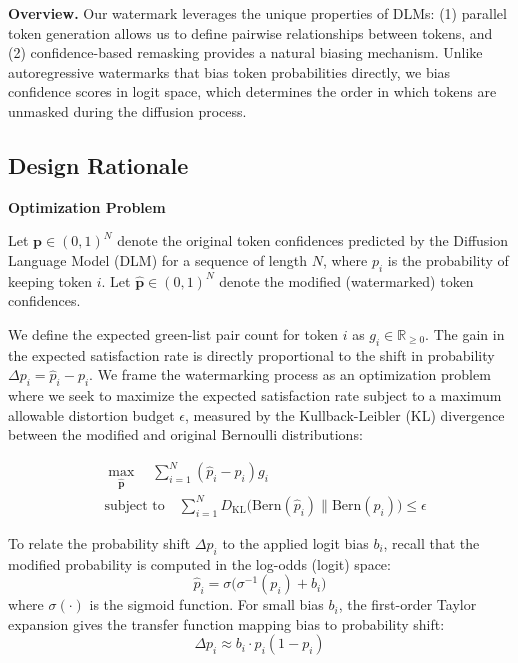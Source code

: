 \textbf{Overview.} Our watermark leverages the unique properties of DLMs: (1) parallel token generation allows us to define pairwise relationships between tokens, and (2) confidence-based remasking provides a natural biasing mechanism. Unlike autoregressive watermarks that bias token probabilities directly, we bias confidence scores in logit space, which determines the order in which tokens are unmasked during the diffusion process.
\subsection*{Design Rationale}

\textbf{Optimization Problem}

Let $\mathbf{p} \in (0,1)^N$ denote the original token confidences predicted by the Diffusion Language Model (DLM) for a sequence of length $N$, where $p_i$ is the probability of keeping token $i$. Let $\mathbf{\hat{p}} \in (0,1)^N$ denote the modified (watermarked) token confidences. 

We define the expected green-list pair count for token $i$ as $g_i \in \mathbb{R}_{\geq 0}$. The gain in the expected satisfaction rate is directly proportional to the shift in probability $\Delta p_i = \hat{p}_i - p_i$. We frame the watermarking process as an optimization problem where we seek to maximize the expected satisfaction rate subject to a maximum allowable distortion budget $\epsilon$, measured by the Kullback-Leibler (KL) divergence between the modified and original Bernoulli distributions:

\begin{equation}
\begin{aligned}
& \max_{\mathbf{\hat{p}}} \quad \sum_{i=1}^{N} (\hat{p}_i - p_i) g_i \\
& \text{subject to} \quad \sum_{i=1}^{N} D_{\text{KL}}\big(\text{Bern}(\hat{p}_i) \parallel \text{Bern}(p_i)\big) \leq \epsilon
\end{aligned}
\end{equation}

To relate the probability shift $\Delta p_i$ to the applied logit bias $b_i$, recall that the modified probability is computed in the log-odds (logit) space:
\begin{equation}
\hat{p}_i = \sigma\big(\sigma^{-1}(p_i) + b_i\big)
\end{equation}
where $\sigma(\cdot)$ is the sigmoid function. For small bias $b_i$, the first-order Taylor expansion gives the transfer function mapping bias to probability shift:
\begin{equation}
\Delta p_i \approx b_i \cdot p_i(1 - p_i)
\end{equation}


